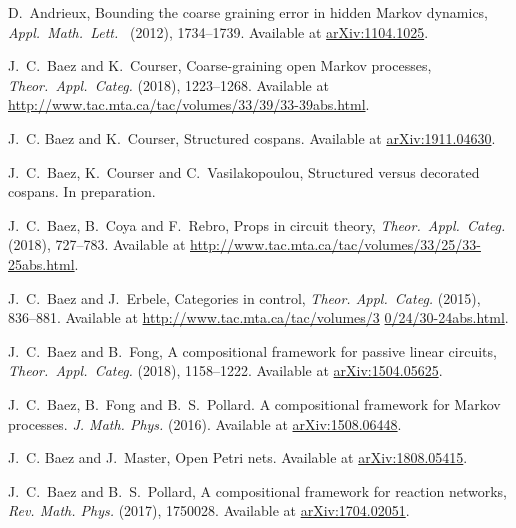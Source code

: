 \documentclass[oneside,final]{ucr}
\theoremstyle{definition}
\newcommand{\define}[1]{{\bf \boldmath #1}}
\begin{document}
{\ssp
\begin{thebibliography}{1}


 D.\ Andrieux, Bounding the coarse graining error in hidden Markov dynamics, \textsl{Appl.\ Math.\ Lett.\ }\define{24} (2012), 1734--1739. Available at \href{https://arxiv.org/abs/1104.1025}{arXiv:1104.1025}.

  J.\  C.\ Baez and K.\ Courser, Coarse-graining open Markov processes, \textsl{Theor.\ Appl.\ Categ.} \define{33} (2018), 1223--1268. Available at \href{http://www.tac.mta.ca/tac/volumes/33/39/33-39abs.html}{http://www.tac.mta.ca/tac/volumes/33/39/33-39abs.html}.

 J.\ C. Baez and K.\ Courser, Structured cospans. Available at \href{https://arxiv.org/abs/1911.04630}{arXiv:1911.04630}.

 J.\ C.\ Baez, K.\ Courser and C.\ Vasilakopoulou, Structured versus decorated cospans. In preparation.

 J.\ C.\ Baez, B.\ Coya and F.\ Rebro, Props in circuit theory, \textsl{Theor.\ Appl.\ Categ.} \define{33} (2018), 727--783. Available at \href{http://www.tac.mta.ca/tac/volumes/33/25/33-25abs.html}{http://www.tac.mta.ca/tac/volumes/33/25/33-25abs.html}.

 J.\ C.\ Baez and J.\ Erbele, Categories in control, 
\textsl{Theor. Appl.\ Categ.} \define{30} (2015), 836--881. Available at
\href{http://www.tac.mta.ca/tac/volumes/30/24/30-24abs.html}
{http://www.tac.mta.ca/tac/volumes/3} \href{http://www.tac.mta.ca/tac/volumes/30/24/30-24abs.html}
{0/24/30-24abs.html}.

 J.\ C.\ Baez and B.\ Fong, A compositional framework for passive linear circuits, \textsl{Theor.\ Appl.\ Categ.} \define{33} (2018), 1158--1222.  Available at \href{http://arxiv.org/abs/1504.05625}{arXiv:1504.05625}. 

 J.\ C.\ Baez, B.\ Fong and B.\ S.\ Pollard. A compositional framework for Markov processes.  \textsl{J. Math. Phys.} \define{57} (2016).  Available at
\href{http://arxiv.org/abs/1508.06448}{arXiv:1508.06448}.

 J.\ C. Baez and J.\ Master, Open Petri nets. Available at \href{https://arxiv.org/abs/1808.05415}{arXiv:1808.05415}.

 J.\ C.\ Baez and B.\ S.\ Pollard, A compositional framework for reaction networks, \textsl{Rev. Math. Phys.} \define{29} (2017), 1750028.  Available at \href{https://arxiv.org/abs/1704.02051}{arXiv:1704.02051}. 


\end{thebibliography}}
\end{document}
